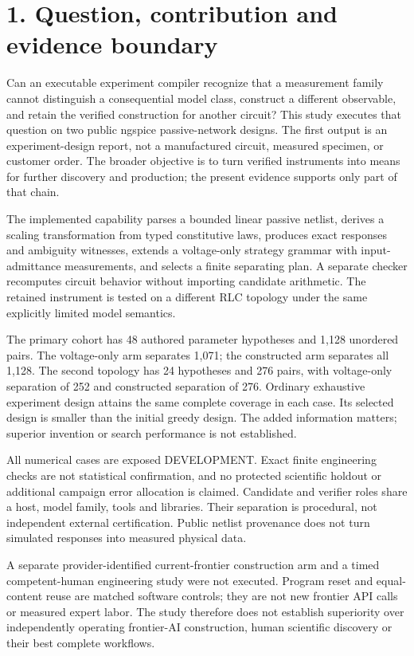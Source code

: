 \documentclass[10pt,letterpaper]{article}
\begin{document}
\section*{\color{accent}1. Question, contribution and evidence boundary}
Can an executable experiment compiler recognize that a measurement family cannot distinguish a consequential model class, construct a different observable, and retain the verified construction for another circuit? This study executes that question on two public ngspice passive-network designs. The first output is an experiment-design report, not a manufactured circuit, measured specimen, or customer order. The broader objective is to turn verified instruments into means for further discovery and production; the present evidence supports only part of that chain.\par
The implemented capability parses a bounded linear passive netlist, derives a scaling transformation from typed constitutive laws, produces exact responses and ambiguity witnesses, extends a voltage-only strategy grammar with input-admittance measurements, and selects a finite separating plan. A separate checker recomputes circuit behavior without importing candidate arithmetic. The retained instrument is tested on a different RLC topology under the same explicitly limited model semantics.\par
The primary cohort has 48 authored parameter hypotheses and 1,128 unordered pairs. The voltage-only arm separates 1,071; the constructed arm separates all 1,128. The second topology has 24 hypotheses and 276 pairs, with voltage-only separation of 252 and constructed separation of 276. Ordinary exhaustive experiment design attains the same complete coverage in each case. Its selected design is smaller than the initial greedy design. The added information matters; superior invention or search performance is not established.\par
All numerical cases are exposed DEVELOPMENT. Exact finite engineering checks are not statistical confirmation, and no protected scientific holdout or additional campaign error allocation is claimed. Candidate and verifier roles share a host, model family, tools and libraries. Their separation is procedural, not independent external certification. Public netlist provenance does not turn simulated responses into measured physical data.\par
A separate provider-identified current-frontier construction arm and a timed competent-human engineering study were not executed. Program reset and equal-content reuse are matched software controls; they are not new frontier API calls or measured expert labor. The study therefore does not establish superiority over independently operating frontier-AI construction, human scientific discovery or their best complete workflows.\par
\end{document}
